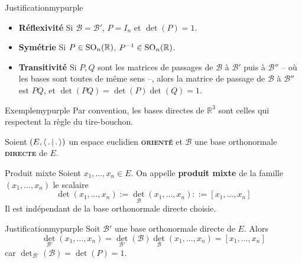     \begin{demo}{Justification}{mypurple}
        \begin{itemize}
            \item \textbf{Réflexivité} \quad Si $\mathcal{B} = \mathcal{B}'$, $P = I_n$ et $\det(P) = 1$.
            \item \textbf{Symétrie} \quad Si $P \in \operatorname{SO}_n(\mathbb{R})$, $P^{-1} \in \operatorname{SO}_n(\mathbb{R})$.
            \item \textbf{Transitivité} \quad Si $P, Q$ sont les matrices de passages de $\mathcal{B}$ à $\mathcal{B}'$ puis à $\mathcal{B}''$ -- où les bases sont toutes de même sens --, alors la matrice de passage de $\mathcal{B}$ à $\mathcal{B}''$ est $PQ$, et $\det(PQ) = \det(P)\det(Q) = 1$.
        \end{itemize}
    \end{demo}

    \begin{omed}{Exemple}{mypurple}
        Par convention, les bases directes de $\mathbb{R}^3$ sont celles qui respectent la règle du tire-bouchon.
    \end{omed}

    Soient $\left(E,\left<\,.\,\middle|\,.\,\right>\right)$ un espace euclidien \textbf{\textsc{orienté}} et $\mathcal{B}$ une base orthonormale \textbf{\textsc{directe}} de $E$.

    \begin{defitheo}{Produit mixte}{}
        Soient $x_1,\ldots,x_n \in E$. On appelle \textbf{produit mixte} de la famille $(x_1,\ldots,x_n)$ le scalaire 
        \[ \det(x_1,\ldots,x_n) := \det_{\mathcal{B}}(x_1,\ldots,x_n) ::= [x_1,\ldots,x_n] \]
        Il est indépendant de la base orthonormale directe choisie.
    \end{defitheo}

    \begin{demo}{Justification}{mypurple}
        Soit $\mathcal{B}'$ une base orthonormale directe de $E$. Alors 
        \[ \det_{\mathcal{B}'}(x_1,\ldots,x_n) = \det_{\mathcal{B}'}(\mathcal{B})\det_{\mathcal{B}}(x_1,\ldots,x_n) = [x_1,\ldots,x_n] \]   
        car $\det_{\mathcal{B}'}(\mathcal{B}) = \det(P) = 1$.
    \end{demo}

